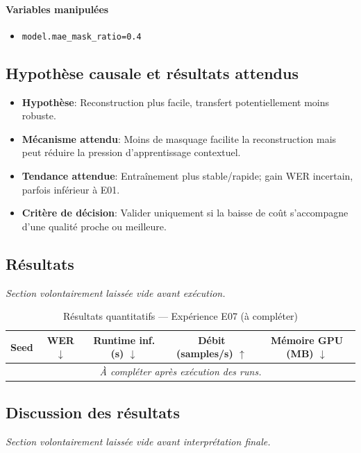 \documentclass[11pt,a4paper]{article}
\begin{document}
\paragraph{Variables manipulées}
\begin{itemize}
\item \texttt{model.mae\_mask\_ratio=0.4}
\end{itemize}

\subsection{Hypothèse causale et résultats attendus}
\begin{itemize}[leftmargin=1.2cm]
\item \textbf{Hypothèse}: Reconstruction plus facile, transfert potentiellement moins robuste.
\item \textbf{Mécanisme attendu}: Moins de masquage facilite la reconstruction mais peut réduire la pression d'apprentissage contextuel.
\item \textbf{Tendance attendue}: Entraînement plus stable/rapide; gain WER incertain, parfois inférieur à E01.
\item \textbf{Critère de décision}: Valider uniquement si la baisse de coût s'accompagne d'une qualité proche ou meilleure.
\end{itemize}

\subsection{Résultats}
\textit{Section volontairement laissée vide avant exécution.}

\begin{table}[H]
\centering
\caption{Résultats quantitatifs --- Expérience E07 (à compléter)}
\begin{tabular}{lcccc}
\toprule
Seed & WER $\downarrow$ & Runtime inf. (s) $\downarrow$ & Débit (samples/s) $\uparrow$ & Mémoire GPU (MB) $\downarrow$ \\
\midrule
\multicolumn{5}{c}{\textit{À compléter après exécution des runs.}} \\
\bottomrule
\end{tabular}
\end{table}

\subsection{Discussion des résultats}
\textit{Section volontairement laissée vide avant interprétation finale.}
\end{document}
